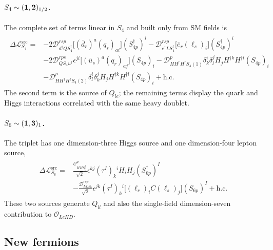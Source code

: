 \paragraph{$S_4\sim({\bf1},{\bf2})_{1/2}$.}
The complete set of terms linear in $S_4$ and built only from SM fields is
\begin{align}
\begin{split}
    \Delta\mathcal L_{S_4}^{\mathrm{src}}={}&
       -2\mathcal D_{d^\dagger Q S_4^\dagger}^{rsp}
        \big[(\overline d_r)^a(q_s)_{ai}\big](S_{4p}^\dagger)^i
       -\mathcal D_{e^\dagger L S_4^\dagger}^{rsp}
        \big[\overline e_r(\ell_s)_i\big](S_{4p}^\dagger)^i
        \\
      &-2\mathcal D_{Q S_4u^\dagger}^{rps}\epsilon^{ji}
        \big[(\overline u_s)^a(q_r)_{aj}\big](S_{4p})_i
       -\mathcal D_{HH^\dagger H^\dagger S_4(1)}^{p}
        \delta^i_k\delta^j_l H_jH^{\dagger k}H^{\dagger l}(S_{4p})_i
        \\
      &-\mathcal D_{HH^\dagger H^\dagger S_4(2)}^{p}
        \delta^i_l\delta^j_k H_jH^{\dagger k}H^{\dagger l}(S_{4p})_i
       +\mathrm{h.c.}
\end{split}
\label{eq:uv-lag-S4}
\end{align}
The second term is the source of $Q_{le}$; the remaining terms display the
quark and Higgs interactions correlated with the same heavy doublet.

\paragraph{$S_6\sim({\bf1},{\bf3})_1$.}
The triplet has one dimension-three Higgs source and one dimension-four
lepton source,
\begin{align}
\begin{split}
    \Delta\mathcal L_{S_6}^{\mathrm{src}}={}&
       \frac{\mathcal C_{HHS_6^\dagger}^{p}}{\sqrt2}
       \epsilon^{kj}(\tau^I)_k{}^i H_iH_j(S_{6p}^\dagger)^I
       \\
      &-\frac{\mathcal D_{LLS_6}^{rsp}}{\sqrt2}
       \epsilon^{jk}(\tau^I)_k{}^i
       \big[(\ell_r)_iC(\ell_s)_j\big](S_{6p})^I
       +\mathrm{h.c.}
\end{split}
\label{eq:uv-lag-S6}
\end{align}
These two sources generate $Q_{ll}$ and also the single-field
dimension-seven contribution to $\mathcal O_{LeHD}$.

\subsection{New fermions}

